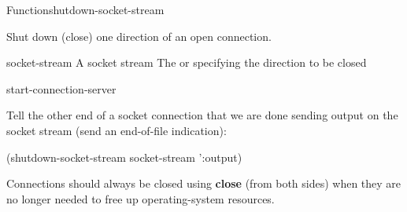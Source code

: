 \documentclass[10pt,twoside,english,pdftex]{article}
\begin{document}
\begin{functiondoc}{Function}{shutdown-socket-stream}%
  {}
%
%

\fnsyntax

\fnpurpose Shut down (close) one direction of an open connection.

\fnpackage {}

\fnmodule {}

\fnargs
\begin{args}{socket-stream}
 A socket stream
\arg[direction] The   or  
specifying the direction to be closed
\end{args}

\begin{alsos}{start-connection-server}
\end{alsos}

\fnexample
Tell the other end of a socket connection that we are done sending
output on the socket stream (send an end-of-file indication):
%
\W\supp
\begin{example}
  (shutdown-socket-stream socket-stream ':output)
\end{example}

\fnnote Connections should always be closed using \textbf{close} (from
both sides) when they are no longer needed to free up operating-system
resources.

\end{functiondoc}

\end{document}

